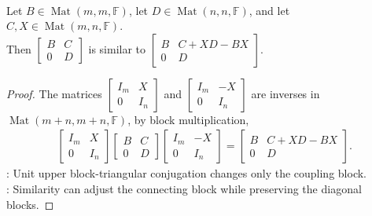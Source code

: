 \begin{proposition} \label{prop:upper-block-triangular-similarity-shift} \\
Let $B\in\operatorname{Mat}(m,m,\mathbb{F})$, let $D\in\operatorname{Mat}(n,n,\mathbb{F})$, and let $C,X\in\operatorname{Mat}(m,n,\mathbb{F})$.\\
Then $\begin{bmatrix}
B & C\\
0 & D
\end{bmatrix}
$ is similar to $\begin{bmatrix}
B & C+XD-BX\\
0 & D
\end{bmatrix}$.
\begin{proof}
The matrices $\begin{bmatrix} I_m & X\\ 0 & I_n \end{bmatrix}$ and $\begin{bmatrix} I_m & -X\\ 0 & I_n \end{bmatrix}$ are inverses in $\operatorname{Mat}(m+n,m+n,\mathbb{F})$, by block multiplication,
\begin{align}
\begin{bmatrix}
I_m & X\\
0 & I_n
\end{bmatrix}
\begin{bmatrix}
B & C\\
0 & D
\end{bmatrix}
\begin{bmatrix}
I_m & -X\\
0 & I_n
\end{bmatrix}
=
\begin{bmatrix}
B & C+XD-BX\\
0 & D
\end{bmatrix}.
\nonumber
\end{align}
: Unit upper block-triangular conjugation changes only the coupling block.\\
: Similarity can adjust the connecting block while preserving the diagonal blocks.
\end{proof}
\end{proposition}
